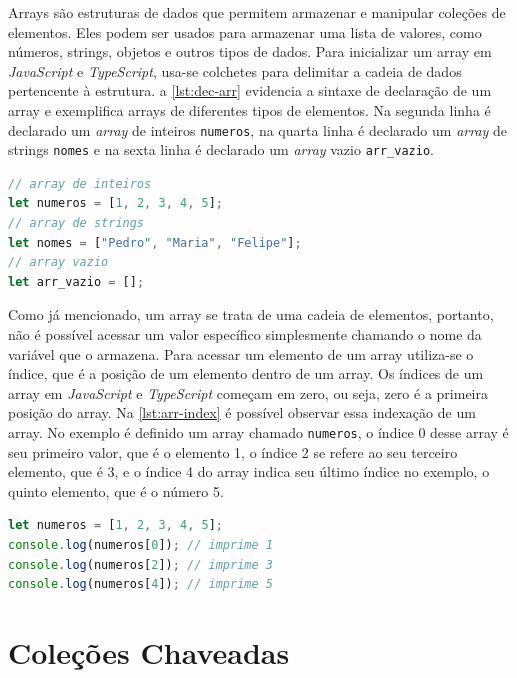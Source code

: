 Arrays são estruturas de dados que permitem armazenar e manipular coleções de elementos. Eles podem ser usados para armazenar uma lista de valores, como números, strings, objetos e outros tipos de dados. Para inicializar um array em \textit{JavaScript} e \textit{TypeScript}, usa-se colchetes para delimitar a cadeia de dados pertencente à estrutura. a \autoref{lst:dec-arr} evidencia a sintaxe de declaração de um array e exemplifica arrays de diferentes tipos de elementos. Na segunda linha é declarado um \textit{array} de inteiros \texttt{numeros}, na quarta linha é declarado um \textit{array} de strings \texttt{nomes} e na sexta linha é declarado um \textit{array} vazio \texttt{arr\_vazio}.

\Needspace{0.3\textheight}
\begin{lstlisting}[language=TypeScript, caption=Sintaxe de Inicialização de Array em JS e TS.,label=lst:dec-arr]
// array de inteiros
let numeros = [1, 2, 3, 4, 5];
// array de strings
let nomes = ["Pedro", "Maria", "Felipe"];
// array vazio
let arr_vazio = [];
\end{lstlisting}

Como já mencionado, um array se trata de uma cadeia de elementos, portanto, não é possível acessar um valor específico simplesmente chamando o nome da variável que o armazena. Para acessar um elemento de um array utiliza-se o índice, que é a posição de um elemento dentro de um array. Os índices de um array em \textit{JavaScript} e \textit{TypeScript} começam em zero, ou seja, zero é a primeira posição do array. Na \autoref{lst:arr-index} é possível observar essa indexação de um array. No exemplo é definido um array chamado \texttt{numeros}, o índice 0 desse array é seu primeiro valor, que é o elemento 1, o índice 2 se refere ao seu terceiro elemento, que é 3, e o índice 4 do array indica seu último índice no exemplo, o quinto elemento, que é o número 5.

\begin{lstlisting}[language=TypeScript, caption=Exemplo de Indexação de Array em JS e TS., label=lst:arr-index]
let numeros = [1, 2, 3, 4, 5];
console.log(numeros[0]); // imprime 1
console.log(numeros[2]); // imprime 3
console.log(numeros[4]); // imprime 5
\end{lstlisting}


\section{Coleções Chaveadas}
\label{JS_colecoesChaveadas}

